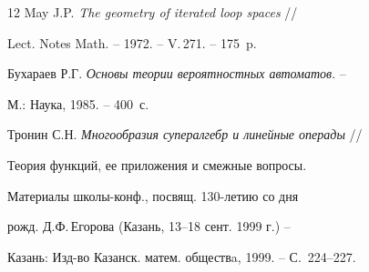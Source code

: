 \begin{thebibliography}{12}
 May J.P. {\em The geometry of iterated loop spaces} //


Lect. Notes Math. -- 1972. -- V.\,271. -- 175~p.





 Бухараев Р.Г. {\em Основы теории вероятностных автоматов}. --


М.: Наука, 1985. -- 400~с.





 Тронин С.Н. {\em Многообразия супералгебр и линейные операды} //


Теория функций, ее приложения и смежные вопросы.


Материалы школы-конф., посвящ. 130-летию со дня


рожд. Д.Ф.\,Егорова (Казань, 13--18 сент. 1999 г.) --


Казань: Изд-во Казанск. матем. обществa, 1999. -- С.~224--227.





\end{thebibliography}





\vskip 2cm












\label{end}











